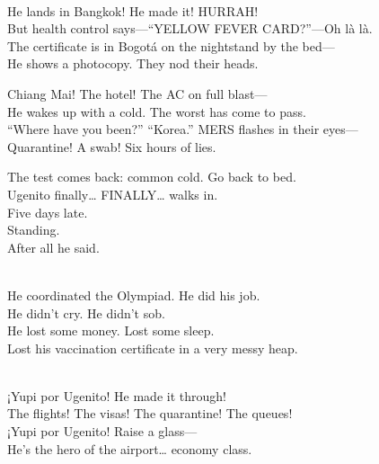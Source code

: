 \begin{lyrics}
\\
He lands in Bangkok! He made it! HURRAH!\\
But health control says—“YELLOW FEVER CARD?”—Oh là là.\\
The certificate is in Bogotá on the nightstand by the bed—\\
He shows a photocopy. %
They nod their heads.


Chiang Mai! The hotel! The AC on full blast—\\
He wakes up with a cold. %
The worst has come to pass.\\
“Where have you been?” “Korea.” MERS flashes in their eyes—\\
Quarantine! A swab! Six hours of lies.


The test comes back: common cold. %
Go back to bed.\\
Ugenito finally… FINALLY… walks in.\\
Five days late.\\
Standing.\\
After all he said.


\\
He coordinated the Olympiad. %
He did his job.\\
He didn’t cry. %
He didn’t sob.\\
He lost some money. %
Lost some sleep.\\
Lost his vaccination certificate in a very messy heap.


\\
¡Yupi por Ugenito! He made it through!\\
The flights! The visas! The quarantine! The queues!\\
¡Yupi por Ugenito! Raise a glass—\\
He’s the hero of the airport… economy class.


\end{lyrics}

